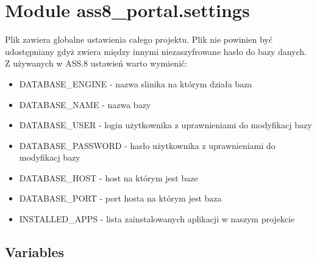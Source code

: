 %
%
%


\section{Module ass8\_portal.settings}

    \label{ass8_portal:settings}
Plik zawiera globalne ustawienia całego projektu. Plik nie powinien być 
udostępniany gdyż zwiera między innymi niezaszyfrowane hasło do bazy 
danych. Z używanych w ASS.8 ustawień warto wymienić:

\begin{itemize}
\setlength{\parskip}{0.6ex}
  \item DATABASE\_ENGINE - nazwa slinika na którym działa baza

  \item DATABASE\_NAME - nazwa bazy

  \item DATABASE\_USER - login użytkownika z uprawnieniami do modyfikacj bazy

  \item DATABASE\_PASSWORD - hasło użytkownika z uprawnieniami do modyfikacj 
    bazy

  \item DATABASE\_HOST - host na którym jest baze

  \item DATABASE\_PORT - port hosta na którym jest baza

  \item INSTALLED\_APPS - lista zainstalowanych aplikacji w naszym projekcie

\end{itemize}



  \subsection{Variables}

